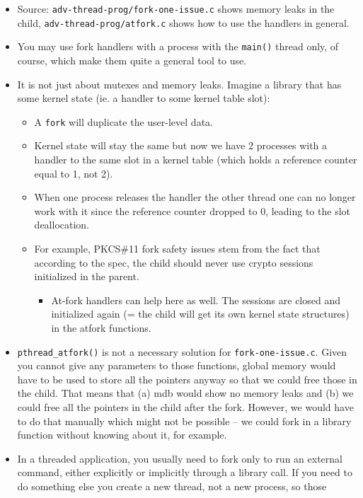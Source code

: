 \begin{itemize}
\item Source: \texttt{adv-thread-prog/fork-one-issue.c} shows memory leaks in
the child, \texttt{adv-thread-prog/at\-fork.c} shows how to use the handlers in
general.
\item You may use fork handlers with a process with the \texttt{main()} thread
only, of course, which make them quite a general tool to use.
\item It is not just about mutexes and memory leaks. Imagine a library that has
some kernel state (ie. a handler to some kernel table slot):
	\begin{itemize}
	\item A \texttt{fork} will duplicate the user-level data.
	\item Kernel state will stay the same but now we have 2 processes with a
	handler to the same slot in a kernel table (which holds a reference
	counter equal to 1, not 2).
	\item When one process releases the handler the other thread one can no
	longer work with it since the reference counter dropped to 0, leading to
	the slot deallocation.
	\item For example, PKCS\#11 fork safety issues stem from the fact that
	according to the spec, the child should never use crypto sessions
	initialized in the parent.
		\begin{itemize}
		\item At-fork handlers can help here as well. The sessions are
		closed and initialized again (= the child will get its own
		kernel state structures) in the atfork functions.
		\end{itemize}
	\end{itemize}
\item \texttt{pthread\_atfork()} is not a necessary solution for
\texttt{fork-one-issue.c}. Given you cannot give any parameters to those
functions, global memory would have to be used to store all the pointers anyway
so that we could free those in the child. That means that (a) mdb would show no
memory leaks and (b) we could free all the pointers in the child after the fork.
However, we would have to do that manually which might not be possible -- we
could fork in a library function without knowing about it, for example.
\item In a threaded application, you usually need to fork only to run an
external command, either explicitly or implicitly through a library call. If you
need to do something else you create a new thread, not a new process, so those

\end{itemize}
